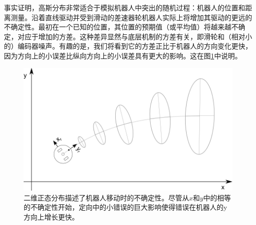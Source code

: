 
事实证明，高斯分布非常适合于模拟机器人中突出的随机过程：机器人的位置和距离测量。沿着直线驱动并受到滑动的差速器轮机器人实际上将增加其驱动的更远的不确定性。最初在一个已知的位置，其位置的预期值（或平均值）将越来越不确定，对应于增加的方差。这种差异显然与底层机制的方差有关，即滑轮和（相对小的）编码器噪声。有趣的是，我们将看到它的方差正比于机器人的方向变化更快，因为方向上的小误差比纵向方向上的小误差具有更大的影响。这在图\ref{fig:errorprop_odometry}中说明。

\begin{figure}
	\centering
		\includegraphics[width=\textwidth]{figs/errorprop_odometry}
	\caption{二维正态分布描述了机器人移动时的不确定性。尽管从$x$和$y$中的相等的不确定性开始，定向中的小错误的巨大影响使得错误在机器人的y方向上增长更快。}
	\label{fig:errorprop_odometry}
\end{figure}

